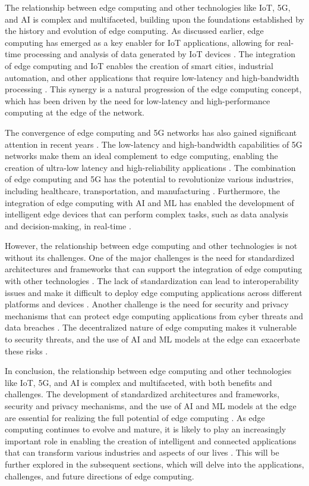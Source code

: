 \documentclass[11pt]{article}
\begin{document}
The relationship between edge computing and other technologies like IoT, 5G, and AI is complex and multifaceted, building upon the foundations established by the history and evolution of edge computing. As discussed earlier, edge computing has emerged as a key enabler for IoT applications, allowing for real-time processing and analysis of data generated by IoT devices \cite{ref13}. The integration of edge computing and IoT enables the creation of smart cities, industrial automation, and other applications that require low-latency and high-bandwidth processing \cite{ref18}. This synergy is a natural progression of the edge computing concept, which has been driven by the need for low-latency and high-performance computing at the edge of the network.

The convergence of edge computing and 5G networks has also gained significant attention in recent years \cite{ref19}. The low-latency and high-bandwidth capabilities of 5G networks make them an ideal complement to edge computing, enabling the creation of ultra-low latency and high-reliability applications \cite{ref20}. The combination of edge computing and 5G has the potential to revolutionize various industries, including healthcare, transportation, and manufacturing \cite{ref21}. Furthermore, the integration of edge computing with AI and ML has enabled the development of intelligent edge devices that can perform complex tasks, such as data analysis and decision-making, in real-time \cite{ref14}.

However, the relationship between edge computing and other technologies is not without its challenges. One of the major challenges is the need for standardized architectures and frameworks that can support the integration of edge computing with other technologies \cite{ref22}. The lack of standardization can lead to interoperability issues and make it difficult to deploy edge computing applications across different platforms and devices \cite{ref23}. Another challenge is the need for security and privacy mechanisms that can protect edge computing applications from cyber threats and data breaches \cite{ref24}. The decentralized nature of edge computing makes it vulnerable to security threats, and the use of AI and ML models at the edge can exacerbate these risks \cite{ref25}.

In conclusion, the relationship between edge computing and other technologies like IoT, 5G, and AI is complex and multifaceted, with both benefits and challenges. The development of standardized architectures and frameworks, security and privacy mechanisms, and the use of AI and ML models at the edge are essential for realizing the full potential of edge computing \cite{ref26}. As edge computing continues to evolve and mature, it is likely to play an increasingly important role in enabling the creation of intelligent and connected applications that can transform various industries and aspects of our lives \cite{ref27}. This will be further explored in the subsequent sections, which will delve into the applications, challenges, and future directions of edge computing.
\end{document}
